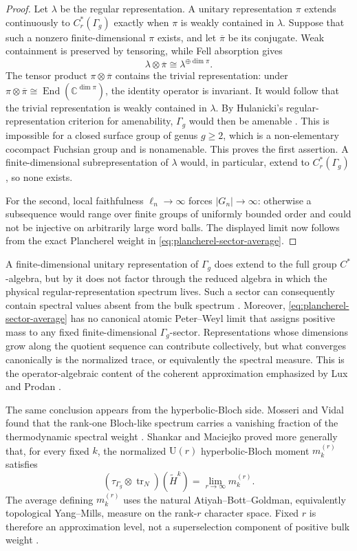 \documentclass[11pt]{article}
\theoremstyle{definition}
\theoremstyle{remark}
\newcommand{\CC}{\mathbb C}
\newcommand{\UU}{\mathrm U}
\newcommand{\End}{\operatorname{End}}
\newcommand{\tr}{\operatorname{tr}}
\begin{document}
\begin{proof}
Let \(\lambda\) be the regular representation.  A unitary representation
\(\pi\) extends continuously to \(C_r^*(\Gamma_g)\) exactly when
\(\pi\) is weakly contained in \(\lambda\).  Suppose that such a nonzero
finite-dimensional \(\pi\) exists, and let \(\overline\pi\) be its conjugate.
Weak containment is preserved by tensoring, while Fell absorption gives
\[
       \lambda\otimes\overline\pi
           \cong \lambda^{\oplus\dim\pi}.
\]
The tensor product \(\pi\otimes\overline\pi\) contains the trivial
representation: under
\(\pi\otimes\overline\pi\cong\End(\CC^{\dim\pi})\), the identity operator is
invariant.  It would follow that the trivial representation is weakly
contained in \(\lambda\).  By Hulanicki's regular-representation criterion
for amenability, \(\Gamma_g\) would then be amenable
\cite{Hulanicki1964}.  This is impossible for a closed surface group of genus
\(g\geq2\), which is a non-elementary cocompact Fuchsian group and is
nonamenable.  This proves the first assertion.  A finite-dimensional
subrepresentation of \(\lambda\) would, in particular, extend to
\(C_r^*(\Gamma_g)\), so none exists.

For the second, local faithfulness \(\ell_n\to\infty\) forces
\(|G_n|\to\infty\): otherwise a subsequence would range over finite groups of
uniformly bounded order and could not be injective on arbitrarily large word
balls.  The displayed limit now follows from the exact Plancherel weight in
\eqref{eq:plancherel-sector-average}.
\end{proof}

A finite-dimensional unitary representation of \(\Gamma_g\) does extend to
the full group \(C^*\)-algebra, but by
 it does not factor through the reduced
algebra in which the physical regular-representation spectrum lives.  Such a
sector can consequently contain spectral values absent from the bulk
spectrum \cite{LuxProdanCayley2024}.  Moreover,
\eqref{eq:plancherel-sector-average} has no canonical atomic Peter--Weyl
limit that assigns positive mass to any fixed finite-dimensional
\(\Gamma_g\)-sector.  Representations whose dimensions grow along the
quotient sequence can contribute collectively, but what converges
canonically is the normalized trace, or equivalently the spectral measure.
This is the operator-algebraic content of the coherent approximation
emphasized by Lux and Prodan
\cite{LuxProdanCayley2024,LuxProdan2023}.

The same conclusion appears from the hyperbolic-Bloch side.  Mosseri and
Vidal found that the rank-one Bloch-like spectrum carries a vanishing fraction
of the thermodynamic spectral weight \cite{MosseriVidal2023}.  Shankar and
Maciejko proved more generally that, for every fixed \(k\), the normalized
\(\UU(r)\) hyperbolic-Bloch moment \(m_k^{(r)}\) satisfies
\[
   (\tau_{\Gamma_g}\otimes\tr_N)(\widetilde H^k)
      =\lim_{r\to\infty}m_k^{(r)}.
 \tag{10.7}\label{eq:large-rank-hbt-moments}
\]
The average defining \(m_k^{(r)}\) uses the natural
Atiyah--Bott--Goldman, equivalently topological Yang--Mills, measure on the
rank-\(r\) character space.  Fixed \(r\) is therefore an approximation level,
not a superselection component of positive bulk weight
\cite{ShankarMaciejko2024}.
\end{document}
